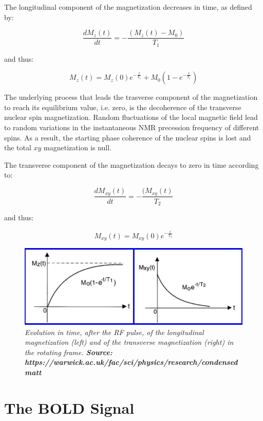 \documentclass[12pt,openright,twoside,a4paper]{book}
\begin{document}
The longitudinal component of the magnetization decreases in time, as defined by:

\begin{equation}
\frac{dM_z(t)}{dt}=-\frac{(M_z(t)-M_0)}{T_1}
\end{equation}

and thus:

\begin{equation}
M_z(t)=M_z(0)e^{-\frac{t}{T_1}}+ M_0(1-e^{-\frac{t}{T_1}})
\end{equation}

The underlying process that leads the trasverse component of the magnetization to reach its equilibrium value, i.e. zero, is the decoherence of the transverse nuclear spin magnetization. 
Random  fluctuations of the local magnetic  field lead to random variations in the instantaneous NMR precession frequency of different spins. 
As a result, the starting phase coherence of the nuclear spins is lost and the total $xy$ magnetization is null. 

The transverse component of the magnetization decays to zero in time according to:

\begin{equation}
\frac{dM_{xy}(t)}{dt}=-\frac{(M_{xy}(t)}{T_2}
\end{equation}

and thus:

\begin{equation}
M_{xy}(t)=M_{xy}(0)e^{-\frac{t}{T_2}}
\end{equation}

\begin{figure}[!h]
\centering
\includegraphics[scale=0.5]{relaxation}
\caption{\textit{ Evolution in time, after the RF pulse, of the longitudinal magnetization (left) and of the transverse magnetization (right) in the rotating frame. \textbf{Source: https://warwick.ac.uk/fac/sci/physics/research/condensedmatt}}}
\label{relaxation}
\end{figure}

\section{The BOLD Signal}
\end{document}
